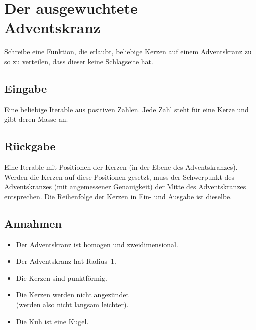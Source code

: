 \documentclass[a4paper, 17 pt]{extarticle}
\begin{document}
\section{Der ausgewuchtete\\ Adventskranz}

Schreibe eine Funktion, die erlaubt, beliebige Kerzen auf einem Adventskranz zu so zu verteilen, dass dieser keine Schlagseite hat.

\subsection{Eingabe}

Eine beliebige Iterable aus positiven Zahlen.
Jede Zahl steht für eine Kerze und gibt deren Masse an.

\subsection{Rückgabe}

Eine Iterable mit Positionen der Kerzen (in der Ebene des Adventskranzes).
Werden die Kerzen auf diese Positionen gesetzt, muss der Schwerpunkt des Adventskranzes (mit angemessener Genauigkeit) der Mitte des Adventskranzes entsprechen.
Die Reihenfolge der Kerzen in Ein- und Ausgabe ist dieselbe.

\subsection{Annahmen}
\begin{itemize}
	\item Der Adventskranz ist homogen und zweidimensional.
	\item Der Adventskranz hat Radius~1.
	\item Die Kerzen sind punktförmig.
	\item Die Kerzen werden nicht angezündet\\ (werden also nicht langsam leichter).
	\item Die Kuh ist eine Kugel.
\end{itemize}
\end{document}
